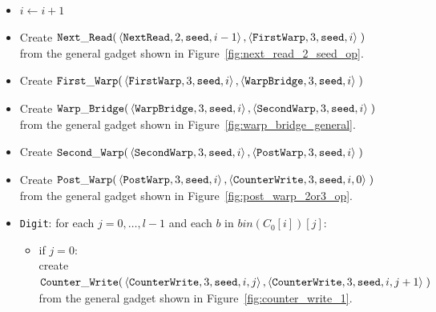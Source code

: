 \begin{itemize}
    \item $i \gets i + 1$

    \item Create
    $\begin{aligned}[t]
        {\tt Next\_Read}(&\left\langle {\tt NextRead},  2, {\tt seed}, i - 1 \right\rangle,
                   \left\langle {\tt FirstWarp}, 3, {\tt seed}, i     \right\rangle \;)
    \end{aligned}$\\ from the general gadget shown in Figure~\ref{fig:next_read_2_seed_op}.

    \item Create
    $\begin{aligned}[t]
        {\tt First\_Warp}(&\left\langle {\tt FirstWarp},  3, {\tt seed}, i \right\rangle,
                    \left\langle {\tt WarpBridge}, 3, {\tt seed}, i \right\rangle \;)
    \end{aligned}$

    \item Create
    $\begin{aligned}[t]
        {\tt Warp\_Bridge}(&\left\langle {\tt WarpBridge}, 3, {\tt seed}, i \right\rangle,
                     \left\langle {\tt SecondWarp}, 3, {\tt seed}, i \right\rangle \;)
    \end{aligned}$\\ from the general gadget shown in Figure~\ref{fig:warp_bridge_general}.

    \item Create
    $\begin{aligned}[t]
        {\tt Second\_Warp}(&\left\langle {\tt SecondWarp}, 3, {\tt seed}, i  \right\rangle,
                     \left\langle {\tt PostWarp},   3, {\tt seed}, i  \right\rangle \;)
    \end{aligned}$

    \item Create
    $\begin{aligned}[t]
        {\tt Post\_Warp}(&\left\langle {\tt PostWarp}, 3, {\tt seed}, i    \right\rangle,
                   \left\langle {\tt CounterWrite},    3, {\tt seed}, i, 0 \right\rangle \;)
    \end{aligned}$\\from the general gadget shown in Figure~\ref{fig:post_warp_2or3_op}.



    \item {\tt Digit}: for each $j=0,\ldots,l-1$ and each $b$ in $bin(C_0[i])[j]$:
    \begin{itemize}
        \item if $j = 0$:\\ create
        $\begin{aligned}[t]
            {\tt Counter\_Write}(&\left\langle {\tt CounterWrite}, 3, {\tt seed}, i, j \right\rangle, \left\langle {\tt CounterWrite}, 3, {\tt seed}, i, j + 1 \right\rangle \;)
        \end{aligned}$\\from the general gadget shown in Figure~\ref{fig:counter_write_1}.


\end{itemize}
\end{itemize}
